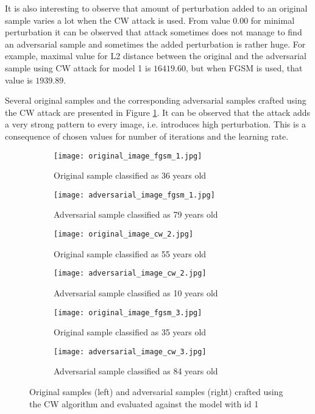 It is also interesting to observe that amount of perturbation added to an original sample varies a lot when the CW attack is used. From value $0.00$ for minimal perturbation it can be observed that attack sometimes does not manage to find an adversarial sample and sometimes the added perturbation is rather huge. For example, maximal value for L2 distance between the original and the adversarial sample using CW attack for model 1 is $16419.60$, but when FGSM is used, that value is $1939.89$.

Several original samples and the corresponding adversarial samples crafted using the CW attack are presented in Figure \ref{fig:cw-attack}. It can be observed that the attack adds a very strong pattern to every image, i.e. introduces high perturbation. This is a consequence of chosen values for number of iterations and the learning rate. 

\begin{figure}

\begin{subfigure}{.5\textwidth}
  \centering
  \texttt{[image: original\_image\_fgsm\_1.jpg]}
  \caption{Original sample classified as 36 years old}
\end{subfigure}
\begin{subfigure}{.5\textwidth}
  \centering
  \texttt{[image: adversarial\_image\_fgsm\_1.jpg]}
  \caption{Adversarial sample classified as 79 years old}
\end{subfigure}

\begin{subfigure}{.5\textwidth}
  \centering
  \texttt{[image: original\_image\_cw\_2.jpg]}
  \caption{Original sample classified as 55 years old}
\end{subfigure}
\begin{subfigure}{.5\textwidth}
  \centering
  \texttt{[image: adversarial\_image\_cw\_2.jpg]}
  \caption{Adversarial sample classified as 10 years old}
\end{subfigure}

\begin{subfigure}{.5\textwidth}
  \centering
  \texttt{[image: original\_image\_fgsm\_3.jpg]}
  \caption{Original sample classified as 35 years old}
\end{subfigure}
\begin{subfigure}{.5\textwidth}
  \centering
  \texttt{[image: adversarial\_image\_cw\_3.jpg]}
  \caption{Adversarial sample classified as 84 years old}
\end{subfigure}

\caption{Original samples (left) and adversarial samples (right) crafted using the CW algorithm and evaluated against the model with id 1}
\label{fig:cw-attack}
\end{figure}


